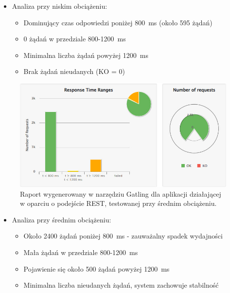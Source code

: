 \documentclass[runningheads,12pt]{llncs}
\begin{document}
\begin{itemize}
  \item Analiza przy niskim obciążeniu:
  \begin{itemize}
    \item Dominujący czas odpowiedzi poniżej 800~ms (około 595 żądań)
    \item 0 żądań w przedziale 800-1200~ms
    \item Minimalna liczba żądań powyżej 1200~ms
    \item Brak żądań nieudanych (KO = 0)
  \end{itemize}
\end{itemize}

\newpage

\begin{figure}
    \includegraphics[width=\linewidth]{images/rest-gatling-moddle-rest.jpg}
    \caption{Raport wygenerowany w narzędziu Gatling dla aplikacji działającej w oparciu o podejście REST, testowanej przy średnim obciążeniu.} \label{fig2}
\end{figure}

\begin{itemize}
  \item Analiza przy średnim obciążeniu:
  \begin{itemize}
    \item Około 2400 żądań poniżej 800~ms - zauważalny spadek wydajności
    \item Mała żądań w przedziale 800-1200~ms
    \item Pojawienie się około 500 żądań powyżej 1200~ms
    \item Minimalna liczba nieudanych żądań, system zachowuje stabilność
  \end{itemize}
\end{itemize}

\newpage
\end{document}

